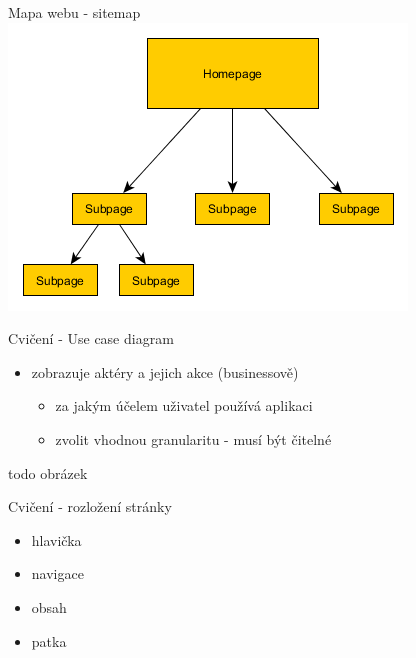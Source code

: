 \documentclass{beamer}
\begin{document}
\begin{frame}{Mapa webu - sitemap}
	  \includegraphics[width=\columnwidth]{sitemap}
\end{frame}


\begin{frame}{Cvičení - Use case diagram}
	\begin{itemize}
		\item zobrazuje aktéry a jejich akce (businessově)
		\begin{itemize}
			\item za jakým účelem uživatel používá aplikaci
			\item zvolit vhodnou granularitu - musí být čitelné
		\end{itemize}  
	\end{itemize}
	
	todo obrázek
	
\end{frame}


\begin{frame}{Cvičení - rozložení stránky}
	\begin{itemize}
		\item hlavička
		\item navigace
		\item obsah
		\item patka 
	\end{itemize}
\end{frame}
\end{document}
